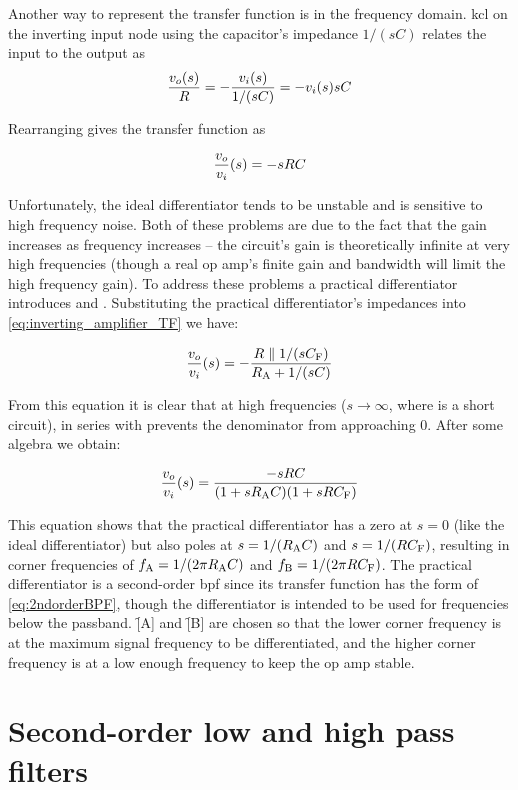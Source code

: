 Another way to represent the transfer function is in the frequency domain.
\ac{kcl} on the inverting input node using the capacitor's impedance \(1/(sC)\) relates the input to the output as \[\frac{\vout(s)}{R} = -\frac{\vin(s)}{1/(sC)}= -\vin(s)sC\]

Rearranging gives the transfer function as

\begin{equation}
	\frac{\vout}{\vin}(s) = -sRC
	\label{eq:ideal_differentiator_TF}
\end{equation}

Unfortunately, the ideal differentiator tends to be unstable and is sensitive to high frequency noise.
Both of these problems are due to the fact that the gain increases as frequency increases -- the circuit's gain is theoretically infinite at very high frequencies (though a real op amp's finite gain and bandwidth will limit the high frequency gain).
To address these problems a practical differentiator introduces \R[A] and \C[F].
Substituting the practical differentiator's impedances into \eqref{eq:inverting_amplifier_TF} we have:

\[\frac{\vout}{\vin}(s) = -\frac{R \parallel 1/(s\C[F])}{\R[A] + 1/(s\C)}\]

From this equation it is clear that at high frequencies (\(s \to \infty\), where \C is a short circuit), \R[A] in series with \C prevents the denominator from approaching 0.
After some algebra we obtain:

\begin{equation}
	\frac{\vout}{\vin}(s) = \frac{-sRC}{(1 + s\R[A] C)(1 + s R \C[F])}
	\label{eq:practical_differentiator_TF}
\end{equation}

This equation shows that the practical differentiator has a zero at \(s = 0\) (like the ideal differentiator) but also poles at \(s = 1/(\R[A] C)\) and \(s = 1/(R \C[F])\), resulting in corner frequencies of \(\f[A] = 1/(2\pi\R[A] C)\) and \(\f[B] = 1/(2\pi R \C[F])\).
The practical differentiator is a second-order \ac{bpf} since its transfer function has the form of \eqref{eq:2ndorderBPF}, though the differentiator is intended to be used for frequencies below the passband.
\f[A] and \f[B] are chosen so that the lower corner frequency is at the maximum signal frequency to be differentiated, and the higher corner frequency is at a low enough frequency to keep the op amp stable.

\section{Second-order low and high pass filters}
